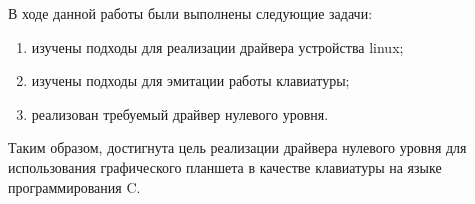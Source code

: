 \Conclusion %

В ходе данной работы были выполнены следующие задачи:

\begin{enumerate}
    \item изучены подходы для реализации драйвера устройства linux;
    \item изучены подходы для эмитации работы клавиатуры;
    \item реализован требуемый драйвер нулевого уровня.
\end{enumerate}

Таким образом, достигнута цель реализации драйвера нулевого уровня для использования графического планшета в качестве клавиатуры на языке программирования C.
